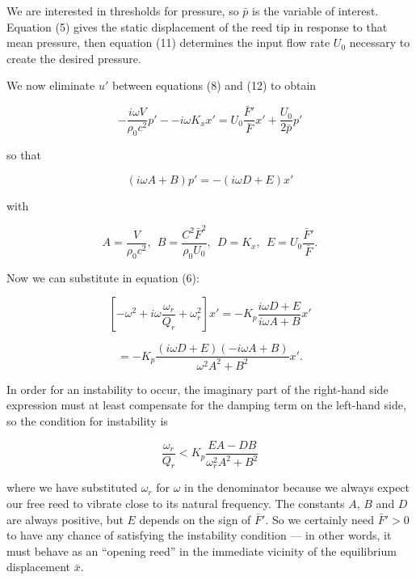   We are interested in thresholds for pressure, so $\bar{p}$ is the variable of 
  interest. Equation (5) gives the static displacement of the reed tip in 
  response to that mean pressure, then equation (11) determines the input flow 
  rate $U_0$ necessary to create the desired pressure. 

  We now eliminate $u'$ between equations (8) and (12) to obtain 

  \begin{equation*}-\dfrac{i \omega V}{\rho_0 c^2}p' -- i \omega K_x x' = U_0 
  \dfrac{\bar{F}'}{\bar{F}} x' + \dfrac{U_0}{2 \bar{p}}p' 
  \tag{13}\end{equation*} 

  \noindent{}so that 

  \begin{equation*}(i \omega A +B)p'=-(i \omega D + E)x' 
  \tag{14}\end{equation*} 

  \noindent{}with 

  \begin{equation*}A=\dfrac{V}{\rho_0 c^2} \mathrm{,~~} B=\dfrac{C^2 
  \bar{F}^2}{\rho_0 U_0} \mathrm{,~~} D=K_x \mathrm{,~~} E=U_0 
  \dfrac{\bar{F}'}{\bar{F}} . \tag{15}\end{equation*} 

  Now we can substitute in equation (6): 

  \begin{equation*}\left[ -\omega^2 + i \omega \dfrac{\omega_r}{Q_r} + 
  \omega_r^2 \right]x' = -K_p \dfrac{i \omega D + E}{i \omega A + B} 
  x'\end{equation*} 

  \begin{equation*}=-K_p \dfrac{(i \omega D + E)(-i \omega A + B)}{\omega^2 A^2 
  + B^2} x' . \tag{16}\end{equation*} 

  In order for an instability to occur, the imaginary part of the right-hand 
  side expression must at least compensate for the damping term on the 
  left-hand side, so the condition for instability is 

  \begin{equation*}\dfrac{\omega_r}{Q_r} < K_p\dfrac{EA-DB}{\omega_r^2 A^2 + 
  B^2} \tag{17}\end{equation*} 

  \noindent{}where we have substituted $\omega_r$ for $\omega$ in the 
  denominator because we always expect our free reed to vibrate close to its 
  natural frequency. The constants $A$, $B$ and $D$ are always positive, but 
  $E$ depends on the sign of $\bar{F}'$. So we certainly need $\bar{F}'>0$ to 
  have any chance of satisfying the instability condition --- in other words, 
  it must behave as an ``opening reed'' in the immediate vicinity of the 
  equilibrium displacement $\bar{x}$. 

